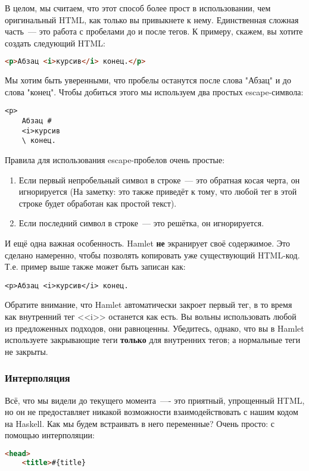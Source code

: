 В целом, мы считаем, что этот способ более прост в использовании, чем
оригинальный HTML, как только вы привыкнете к нему. Единственная
сложная часть~--- это работа с пробелами до и после тегов. К примеру, скажем, вы
хотите создать следующий HTML:

\begin{lstlisting}[language=HTML]
<p>Абзац <i>курсив</i> конец.</p>
\end{lstlisting}

Мы хотим быть уверенными, что пробелы останутся после слова "Абзац" и до слова
"конец". Чтобы добиться этого мы используем два простых escape-символа:

\begin{lstlisting}
<p>
    Абзац #
    <i>курсив
    \ конец.
\end{lstlisting}

Правила для использования escape-пробелов очень простые:
\begin{enumerate}
    \item Если первый непробельный символ в строке~--- это обратная косая черта,
        он игнорируется (На заметку: это также приведёт к тому, что любой тег
        в этой строке будет обработан как простой текст).
    \item Если последний символ в строке~--- это решётка, он игнорируется.
\end{enumerate}

И ещё одна важная особенность. Hamlet \textbf{не} экранирует своё содержимое.
Это сделано намеренно, чтобы позволять копировать уже существующий HTML-код.
Т.е. пример выше также может быть записан как:
\begin{lstlisting}
<p>Абзац <i>курсив</i> конец.
\end{lstlisting}

Обратите внимание, что Hamlet автоматически закроет первый тег, в то время как
внутренний тег <<i>> останется как есть. Вы вольны использовать любой из
предложенных подходов, они равноценны. Убедитесь, однако, что вы в Hamlet
используете закрывающие теги \textbf{только} для внутренних тегов; а нормальные
теги не закрыты.

\subsubsection{Интерполяция}

Всё, что мы видели до текущего момента~---- это приятный, упрощенный
HTML, но он не предоставляет никакой возможности взаимодействовать с
нашим кодом на Haskell.  Как мы будем встраивать в него переменные?
Очень просто: с помощью интерполяции:
\begin{lstlisting}[language=HTML]
<head>
    <title>#{title}
\end{lstlisting}

